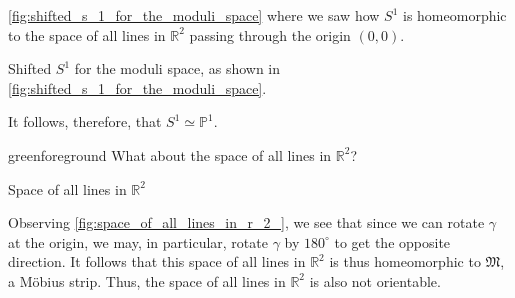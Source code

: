 \documentclass[notoc,notitlepage]{tufte-book}
\begin{document}
 \cref{fig:shifted_s_1_for_the_moduli_space} where we saw how $S^1$ is
homeomorphic to the space of all lines in $\mathbb{R}^2$ passing through the origin $(0,
0)$.
\begin{marginfigure}[5pt]
  \centering
  \caption{Shifted $S^1$ for the moduli space, as shown in
  \cref{fig:shifted_s_1_for_the_moduli_space}.}
\end{marginfigure}

It follows, therefore, that $S^1 \simeq \mathbb{P}^1$.

\begin{quotebox}{green}{foreground}
  What about the space of all lines in $\mathbb{R}^2$?
\end{quotebox}

\begin{marginfigure}
  \centering
  \caption{Space of all lines in $\mathbb{R}^2$}\label{fig:space_of_all_lines_in_r_2_}
\end{marginfigure}
Observing \cref{fig:space_of_all_lines_in_r_2_}, we see that since we can rotate $\gamma$
at the origin, we may, in particular, rotate $\gamma$ by $180^{\circ}$ to get the opposite
direction. It follows that this space of all lines in $\mathbb{R}^2$ is thus homeomorphic
to $\mathfrak{M}$, a M\"{o}bius strip. Thus, the space of all lines in $\mathbb{R}^2$ is
also not orientable.
\end{document}
